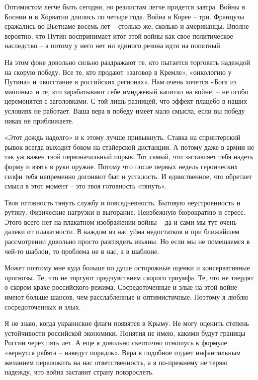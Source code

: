 Оптимистом легче быть сегодня, но реалистам легче придется завтра. Войны в
Боснии и в Хорватии длились по четыре года. Война в Корее – три. Французы
сражались во Вьетнаме восемь лет – столько же, сколько и американцы. Вполне
вероятно, что Путин воспринимает итог этой войны как свое политическое
наследство – а потому у него нет ни единого резона идти на попятный. 

На этом фоне довольно сильно раздражают те, кто пытается торговать надеждой на
скорую победу. Все те, кто продают «заговор в Кремле», «онкологию у Путина» и
«восстание в российских регионах». Нам очень хочется «Бога из машины» и те, кто
зарабатывают себе имиджевый капитал на войне, – не особо церемонятся с
заголовками. С той лишь разницей, что эффект плацебо в наших условиях не
работает. Ваша вера в победу имеет мало смысла, если вы победу никак не
приближаете. 

«Этот дождь надолго» и к этому лучше привыкнуть. Ставка на спринтерский рывок
всегда выходит боком на стайерской дистанции. А потому даже в армии не так уж
важен твой первоначальный порыв. Тот самый, что заставляет тебя надеть форму и
взять в руки оружие. Потому что после первых недель героических селфи тебя
непременно догоняют быт и усталость. И единственное, что обретает смысл в этот
момент – это твоя готовность «тянуть». 

Твоя готовность тянуть службу и повседневность. Бытовую неустроенность и
рутину. Физические нагрузки и выгорание. Неизбежную бюрократию и стресс. Этого
всего нет на плакатном изображении войны – да и сами мы тут очень далеки от
плакатности. В каждом из нас уйма недостатков и при ближайшем рассмотрении
довольно просто разглядеть изъяны. Но если мы не помещаемся в чей-то шаблон, то
проблема не в нас, а в шаблоне. 

Может поэтому мне куда больше по душе осторожные оценки и консервативные
прогнозы. Те, что не торгуют предчувствием скорого триумфа. Те, что не твердят
о скором крахе российского режима. Сосредоточенные и злые на этой войне имеют
больше шансов, чем расслабленные и оптимистичные. Поэтому я люблю
сосредоточенных и злых. 

Я не знаю, когда украинские флаги появятся в Крыму. Не могу оценить степень
устойчивости российской экономики. Понятия не имею, какими будут границы России
через пять лет. А еще я довольно скептично отношусь к формуле «вернутся ребята
– наведут порядок». Вера в подобное отдает инфантильным желанием переложить на
нас ответственность, а я по-прежнему не теряю надежду, что война заставит
страну повзрослеть.  


